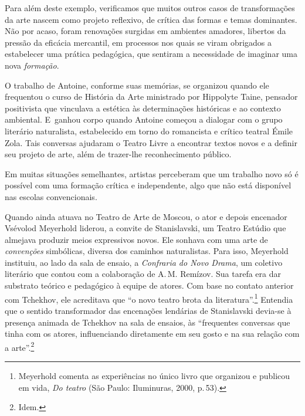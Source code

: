 Para além deste exemplo, verificamos que muitos outros casos de
transformações da arte nascem como projeto reflexivo, de crítica das
formas e temas dominantes. Não por acaso, foram renovações surgidas em
ambientes amadores, libertos da pressão da eficácia mercantil,
em processos nos quais se viram obrigados a estabelecer uma prática
pedagógica, que sentiram a necessidade de imaginar uma nova
{\it formação}.

O trabalho de Antoine, conforme suas memórias, se organizou
quando ele frequentou o curso de História da Arte ministrado por Hippolyte
Taine, pensador positivista que vinculava a estética às determinações
históricas e ao contexto ambiental. E~ganhou corpo quando Antoine
começou a dialogar com o grupo literário naturalista, estabelecido em
torno do romancista e crítico teatral Émile Zola. Tais conversas
ajudaram o Teatro Livre a encontrar textos novos e a definir seu
projeto de arte, além de trazer-lhe reconhecimento público.

Em muitas situações semelhantes, artistas perceberam que um trabalho
novo só é possível com uma formação crítica e independente, algo que não
está disponível nas escolas convencionais.

Quando ainda atuava no Teatro de Arte de Moscou, o ator e depois
encenador Vsévolod Meyerhold liderou, a convite de Stanislavski, um
Teatro Estúdio que almejava produzir meios expressivos novos. Ele
sonhava com uma arte de {\it convenções} simbólicas, diversa dos
caminhos naturalistas. Para isso, Meyerhold instituiu, ao lado da sala
de ensaio, a {\it Confraria do Novo Drama}, um coletivo literário que
contou com a colaboração de A.\,M. Remízov. Sua tarefa era dar substrato
teórico e pedagógico à equipe de atores. Com base no contato anterior
com Tchekhov, ele acreditava que “o novo teatro brota da
literatura”.\footnote{Meyerhold comenta as experiências no único livro
  que organizou e publicou em vida, {\it Do teatro} (São Paulo:
  Iluminuras, 2000, p.\,53).} Entendia que o sentido transformador das
encenações lendárias de Stanislavski devia-se à presença animada de
Tchekhov na sala de ensaios, às “frequentes conversas que tinha com os
atores, influenciando diretamente em seu gosto e na sua relação com a
arte”.\footnote{Idem.}


